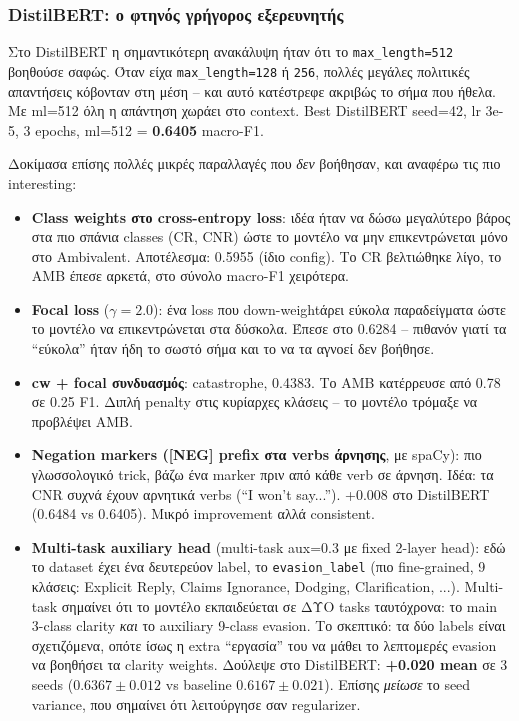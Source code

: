 \documentclass[12pt]{fphw}
\begin{document}
\subsubsection{DistilBERT: ο φτηνός γρήγορος εξερευνητής}

Στο DistilBERT η σημαντικότερη ανακάλυψη ήταν ότι το \texttt{max\_length=512} βοηθούσε σαφώς. Όταν είχα \texttt{max\_length=128} ή \texttt{256}, πολλές μεγάλες πολιτικές απαντήσεις κόβονταν στη μέση -- και αυτό κατέστρεφε ακριβώς το σήμα που ήθελα. Με ml=512 όλη η απάντηση χωράει στο context. Best DistilBERT seed=42, lr 3e-5, 3 epochs, ml=512 = \textbf{0.6405} macro-F1.

Δοκίμασα επίσης πολλές μικρές παραλλαγές που \emph{δεν} βοήθησαν, και αναφέρω τις πιο interesting:

\begin{itemize}
    \item \textbf{Class weights στο cross-entropy loss}: ιδέα ήταν να δώσω μεγαλύτερο βάρος στα πιο σπάνια classes (CR, CNR) ώστε το μοντέλο να μην επικεντρώνεται μόνο στο Ambivalent. Αποτέλεσμα: 0.5955 (ίδιο config). Το CR βελτιώθηκε λίγο, το AMB έπεσε αρκετά, στο σύνολο macro-F1 χειρότερα.
    \item \textbf{Focal loss} ($\gamma=2.0$): ένα loss που down-weightάρει εύκολα παραδείγματα ώστε το μοντέλο να επικεντρώνεται στα δύσκολα. Έπεσε στο 0.6284 -- πιθανόν γιατί τα ``εύκολα'' ήταν ήδη το σωστό σήμα και το να τα αγνοεί δεν βοήθησε.
    \item \textbf{cw + focal συνδυασμός}: catastrophe, 0.4383. Το AMB κατέρρευσε από 0.78 σε 0.25 F1. Διπλή penalty στις κυρίαρχες κλάσεις -- το μοντέλο τρόμαξε να προβλέψει AMB.
    \item \textbf{Negation markers ([NEG] prefix στα verbs άρνησης}, με spaCy): πιο γλωσσολογικό trick, βάζω ένα marker πριν από κάθε verb σε άρνηση. Ιδέα: τα CNR συχνά έχουν αρνητικά verbs (``I won't say...''). +0.008 στο DistilBERT (0.6484 vs 0.6405). Μικρό improvement αλλά consistent.
    \item \textbf{Multi-task auxiliary head} (multi-task aux=0.3 με fixed 2-layer head): εδώ το dataset έχει ένα δευτερεύον label, το \texttt{evasion\_label} (πιο fine-grained, 9 κλάσεις: Explicit Reply, Claims Ignorance, Dodging, Clarification, ...). Multi-task σημαίνει ότι το μοντέλο εκπαιδεύεται σε ΔΥΟ tasks ταυτόχρονα: το main 3-class clarity \emph{και} το auxiliary 9-class evasion. Το σκεπτικό: τα δύο labels είναι σχετιζόμενα, οπότε ίσως η extra ``εργασία'' του να μάθει το λεπτομερές evasion να βοηθήσει τα clarity weights. Δούλεψε στο DistilBERT: \textbf{+0.020 mean} σε 3 seeds ($0.6367 \pm 0.012$ vs baseline $0.6167 \pm 0.021$). Επίσης \emph{μείωσε} το seed variance, που σημαίνει ότι λειτούργησε σαν regularizer.
\end{itemize}
\end{document}
